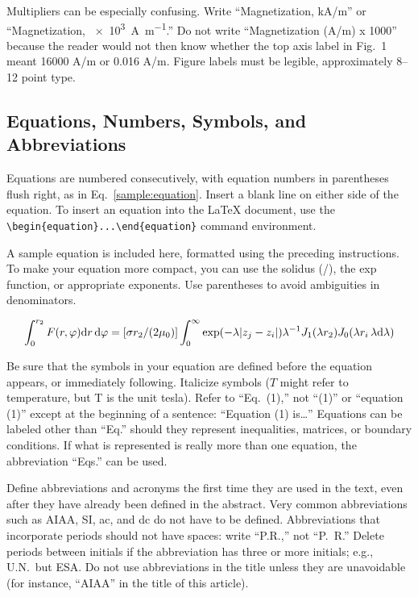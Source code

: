 Multipliers can be especially confusing. Write ``Magnetization, \si[per-mode=symbol]{\kilo\ampere\per\meter}'' or ``Magnetization, \SI[per-mode=symbol]{e3}{\ampere\per\meter}.'' Do not write ``Magnetization (A/m) x 1000'' because the reader would not then know whether the top axis label in Fig.~1 meant 16000 A/m or 0.016 A/m. Figure labels must be legible, approximately 8--12 point type.

\subsection{Equations, Numbers, Symbols, and Abbreviations}
Equations are numbered consecutively, with equation numbers in parentheses flush right, as in Eq.~\eqref{sample:equation}. Insert a blank line on either side of the equation. To insert an equation into the \LaTeX{} document, use the \verb|\begin{equation}...\end{equation}| command environment.

A sample equation is included here, formatted using the preceding instructions. To make your equation more compact, you can use the solidus (/), the exp function, or appropriate exponents. Use parentheses to avoid ambiguities in denominators.

\begin{equation}
\label{sample:equation}
\int^{r_2}_0 F(r,\varphi){\rm d}r\,{\rm d}\varphi = [\sigma r_2/(2\mu_0)]\int^{\infty}_0\exp(-\lambda|z_j-z_i|)\lambda^{-1}J_1 (\lambda r_2)J_0 (\lambda r_i\,\lambda {\rm d}\lambda)
\end{equation}

Be sure that the symbols in your equation are defined before the equation appears, or immediately following. Italicize symbols ($T$ might refer to temperature, but T is the unit tesla). Refer to ``Eq.~(1),'' not ``(1)'' or ``equation (1)'' except at the beginning of a sentence: ``Equation (1) is\ldots'' Equations can be labeled other than ``Eq.'' should they represent inequalities, matrices, or boundary conditions. If what is represented is really more than one equation, the abbreviation ``Eqs.'' can be used.

Define abbreviations and acronyms the first time they are used in the text, even after they have already been defined in the abstract. Very common abbreviations such as AIAA, SI, ac, and dc do not have to be defined. Abbreviations that incorporate periods should not have spaces: write ``P.R.,'' not ``P.~R.'' Delete periods between initials if the abbreviation has three or more initials; e.g., U.N.~but ESA. Do not use abbreviations in the title unless they are unavoidable (for instance, ``AIAA'' in the title of this article).

